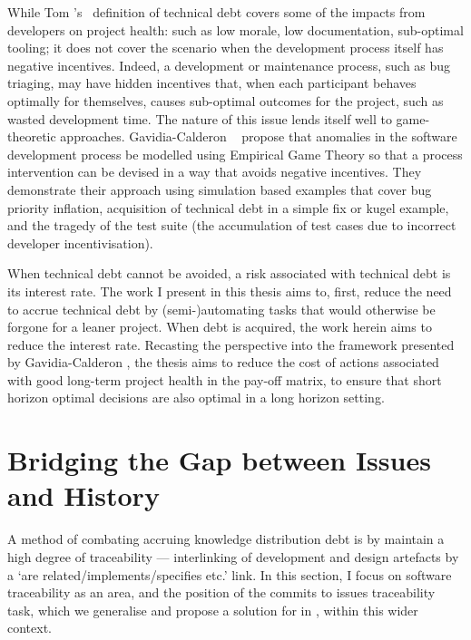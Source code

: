 While Tom \etal's~\cite{tom2013exploration} definition of technical debt covers
some of the impacts from developers on project health: such as low morale, low
documentation, sub-optimal tooling; it does not cover the scenario when the
development process itself has negative incentives. Indeed, a development or
maintenance process, such as bug triaging, may have hidden incentives that, when
each participant behaves optimally for themselves, causes sub-optimal outcomes
for the project, such as wasted development time. The nature of this issue lends
itself well to game-theoretic approaches. Gavidia-Calderon
\etal~\cite{gavidia2020game, gavidia2019assessor} propose that anomalies in the
software development process be modelled using Empirical Game Theory so that a
process intervention can be devised in a way that avoids negative incentives.
They demonstrate their approach using simulation based examples that cover bug
priority inflation, acquisition of technical debt in a simple fix or kugel
example, and the tragedy of the test suite (the accumulation of test cases due
to incorrect developer incentivisation). 

When technical debt cannot be avoided, a risk associated with technical debt is
its interest rate. The work I present in this thesis aims to, first, reduce the
need to accrue technical debt by (semi-)automating tasks that would otherwise be
forgone for a leaner project. When debt is acquired, the work herein aims to
reduce the interest rate. Recasting the perspective into the framework presented
by Gavidia-Calderon \etal, the thesis aims to reduce the cost of actions
associated with good long-term project health in the pay-off matrix, \ie to
ensure that short horizon optimal decisions are also optimal in a long
horizon setting.

\section{Bridging the Gap between Issues and History}
\label{chapter:literature:sec:am_rel_work}

A method of combating accruing knowledge distribution debt is by maintain a high
degree of traceability --- interlinking of development and design artefacts by a
`are related/implements/specifies etc.' link. In this section, I focus on
software traceability as an area, and the position of the commits to issues
traceability task, which we generalise and propose a solution for in
, within this wider context.

